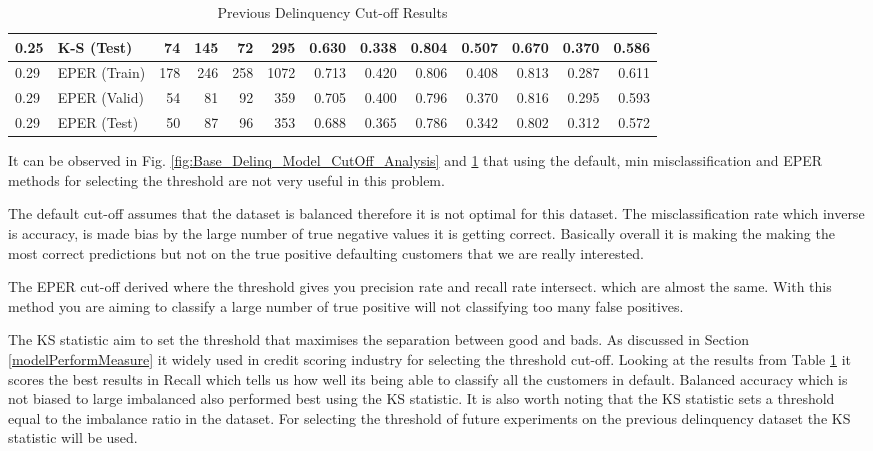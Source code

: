 \begin{table}[H]
{\begin{tabular}{l|l|r|r|r|r|r|r|r|r|r|r|r}
			0.25             & K-S (Test)  & 74          & 145         & 72          & 295         & 0.630             & 0.338              & 0.804        & 0.507           & 0.670                & 0.370  & 0.586     \\ \hline
			0.29             & EPER (Train)          & 178         & 246         & 258         & 1072        & 0.713             & 0.420              & 0.806        & 0.408           & 0.813                & 0.287  & 0.611     \\
			0.29             & EPER (Valid)          & 54          & 81          & 92          & 359         & 0.705             & 0.400              & 0.796        & 0.370           & 0.816                & 0.295    & 0.593   \\
			0.29             & EPER (Test)           & 50          & 87          & 96          & 353         & 0.688             & 0.365              & 0.786        & 0.342           & 0.802                & 0.312  & 0.572    \\ \hline
		\end{tabular}
	}
	\caption{Previous Delinquency Cut-off Results }
	\label{table:DelinquencyModelCutoff}
\end{table}

It can be observed in Fig. \ref{fig:Base_Delinq_Model_CutOff_Analysis} and \ref{table:DelinquencyModelCutoff} that using the default, min misclassification and EPER methods for selecting the threshold are not very useful in this problem.

The default cut-off assumes that the dataset is balanced therefore it is not optimal for this dataset. The misclassification rate which inverse is accuracy, is made bias by the large number of true negative values it is getting correct. Basically overall it is making the making the most correct predictions but not on the true positive defaulting customers that we are really interested. 

The EPER cut-off derived where the threshold gives you precision rate and recall rate intersect. which are almost the same. With this method you are aiming to classify a large number of true positive will not classifying too many false positives. 

The KS statistic aim to set the threshold that maximises the separation between good and bads. As discussed in Section \ref{modelPerformMeasure} it widely used in credit scoring industry for selecting the threshold cut-off. Looking at the results from Table \ref{table:DelinquencyModelCutoff} it scores the best results in Recall which tells us how well its being able to classify all the customers in default. Balanced accuracy which is not biased to large imbalanced also performed best using the KS statistic. It is also worth noting that the KS statistic sets a threshold equal to the imbalance ratio in the dataset. For selecting the threshold of future experiments on the previous delinquency dataset the KS statistic will be used. 



